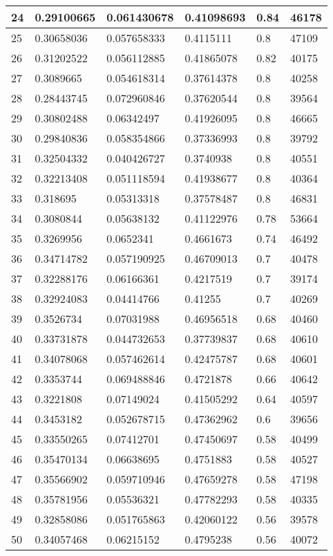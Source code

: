 \begin{longtable}{|l|l|l|l|l|l|}
24 & 0.29100665 & 0.061430678 & 0.41098693 & 0.84 & 46178 \\ \hline 
25 & 0.30658036 & 0.057658333 & 0.4115111 & 0.8 & 47109 \\ \hline 
26 & 0.31202522 & 0.056112885 & 0.41865078 & 0.82 & 40175 \\ \hline 
27 & 0.3089665 & 0.054618314 & 0.37614378 & 0.8 & 40258 \\ \hline 
28 & 0.28443745 & 0.072960846 & 0.37620544 & 0.8 & 39564 \\ \hline 
29 & 0.30802488 & 0.06342497 & 0.41926095 & 0.8 & 46665 \\ \hline 
30 & 0.29840836 & 0.058354866 & 0.37336993 & 0.8 & 39792 \\ \hline 
31 & 0.32504332 & 0.040426727 & 0.3740938 & 0.8 & 40551 \\ \hline 
32 & 0.32213408 & 0.051118594 & 0.41938677 & 0.8 & 40364 \\ \hline 
33 & 0.318695 & 0.05313318 & 0.37578487 & 0.8 & 46831 \\ \hline 
34 & 0.3080844 & 0.05638132 & 0.41122976 & 0.78 & 53664 \\ \hline 
35 & 0.3269956 & 0.0652341 & 0.4661673 & 0.74 & 46492 \\ \hline 
36 & 0.34714782 & 0.057190925 & 0.46709013 & 0.7 & 40478 \\ \hline 
37 & 0.32288176 & 0.06166361 & 0.4217519 & 0.7 & 39174 \\ \hline 
38 & 0.32924083 & 0.04414766 & 0.41255 & 0.7 & 40269 \\ \hline 
39 & 0.3526734 & 0.07031988 & 0.46956518 & 0.68 & 40460 \\ \hline 
40 & 0.33731878 & 0.044732653 & 0.37739837 & 0.68 & 40610 \\ \hline 
41 & 0.34078068 & 0.057462614 & 0.42475787 & 0.68 & 40601 \\ \hline 
42 & 0.3353744 & 0.069488846 & 0.4721878 & 0.66 & 40642 \\ \hline 
43 & 0.3221808 & 0.07149024 & 0.41505292 & 0.64 & 40597 \\ \hline 
44 & 0.3453182 & 0.052678715 & 0.47362962 & 0.6 & 39656 \\ \hline 
45 & 0.33550265 & 0.07412701 & 0.47450697 & 0.58 & 40499 \\ \hline 
46 & 0.35470134 & 0.06638695 & 0.4751883 & 0.58 & 40527 \\ \hline 
47 & 0.35566902 & 0.059710946 & 0.47659278 & 0.58 & 47198 \\ \hline 
48 & 0.35781956 & 0.05536321 & 0.47782293 & 0.58 & 40335 \\ \hline 
49 & 0.32858086 & 0.051765863 & 0.42060122 & 0.56 & 39578 \\ \hline 
50 & 0.34057468 & 0.06215152 & 0.4795238 & 0.56 & 40072 \\ \hline 
\end{longtable}